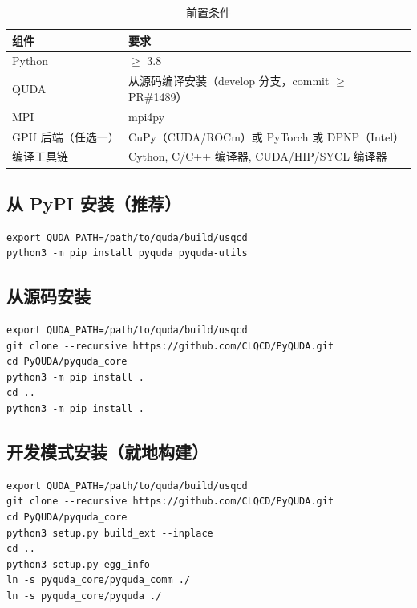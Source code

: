 \documentclass[12pt,a4paper]{ctexart}
\begin{document}
\begin{table}[h]
\centering
\begin{tabular}{@{}ll@{}}
\toprule
\textbf{组件} & \textbf{要求} \\
\midrule
Python              & $\ge$ 3.8 \\
QUDA                & 从源码编译安装（develop 分支，commit $\ge$ PR\#1489）\\
MPI                 & mpi4py \\
GPU 后端（任选一）  & CuPy（CUDA/ROCm）或 PyTorch 或 DPNP（Intel）\\
编译工具链          & Cython, C/C++ 编译器, CUDA/HIP/SYCL 编译器 \\
\bottomrule
\end{tabular}
\caption{前置条件}
\end{table}

\subsection{从 PyPI 安装（推荐）}

\begin{lstlisting}[style=bashcode]
export QUDA_PATH=/path/to/quda/build/usqcd
python3 -m pip install pyquda pyquda-utils
\end{lstlisting}

\subsection{从源码安装}

\begin{lstlisting}[style=bashcode]
export QUDA_PATH=/path/to/quda/build/usqcd
git clone --recursive https://github.com/CLQCD/PyQUDA.git
cd PyQUDA/pyquda_core
python3 -m pip install .
cd ..
python3 -m pip install .
\end{lstlisting}

\subsection{开发模式安装（就地构建）}

\begin{lstlisting}[style=bashcode]
export QUDA_PATH=/path/to/quda/build/usqcd
git clone --recursive https://github.com/CLQCD/PyQUDA.git
cd PyQUDA/pyquda_core
python3 setup.py build_ext --inplace
cd ..
python3 setup.py egg_info
ln -s pyquda_core/pyquda_comm ./
ln -s pyquda_core/pyquda ./
\end{lstlisting}
\end{document}
